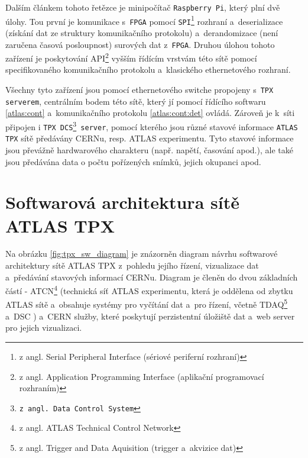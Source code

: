 Dalším článkem tohoto řetězce je minipočítač \texttt{Raspberry Pi}, který plní dvě úlohy. Tou první je komunikace s~\texttt{FPGA} pomocí \texttt{SPI}\footnote{z angl. Serial Peripheral Interface (sériové periferní rozhraní)} rozhraní a~deserializace (získání dat ze struktury komunikačního protokolu) a~derandomizace (není zaručena časová posloupnost) surových dat z~\texttt{FPGA}. Druhou úlohou tohoto zařízení je poskytování API\footnote{z angl. Application Programming Interface (aplikační programovací rozhraním)} vyšším řídícím vrstvám této sítě pomocí specifikovaného komunikačního protokolu a~klasického ethernetového rozhraní.

Všechny tyto zařízení jsou pomocí ethernetového switche propojeny s~\texttt{TPX serverem}, centrálním bodem této sítě, který jí pomocí řídícího softwaru \ref{atlas:cont} a~komunikačního protokolu \ref{atlas:cont:det} ovládá. Zároveň je k~síti připojen i \texttt{TPX DCS\footnote{z angl. Data Control System} server}, pomocí kterého jsou různé stavové informace \texttt{ATLAS TPX} sítě předávány CERNu, resp. ATLAS experimentu. Tyto stavové informace jsou převážně hardwarového charakteru (např. napětí, časování apod.), ale také jsou předávána data o počtu pořízených snímků, jejich okupanci apod.

\section{Softwarová architektura sítě ATLAS TPX}\label{atlas:sw_arch}
Na obrázku \ref{fig:tpx_sw_diagram} je znázorněn diagram návrhu softwarové architektury sítě ATLAS TPX z~pohledu jejího řízení, vizualizace dat a~předávání stavových informací CERNu. Diagram je členěn do dvou základních částí - ATCN\footnote{z angl. ATLAS Technical Control Network} (technická síť ATLAS experimentu, která je oddělena od zbytku ATLAS sítě a~obsahuje systémy pro vyčítání dat a~pro řízení, včetně TDAQ\footnote{z angl. Trigger and Data Aquisition (trigger a~akvizice dat)} a~DSC \cite{Ballestrero:atlas_network_upgrade}) a~CERN služby, které poskytují perzistentní úložiště dat a~web server pro jejich vizualizaci.

